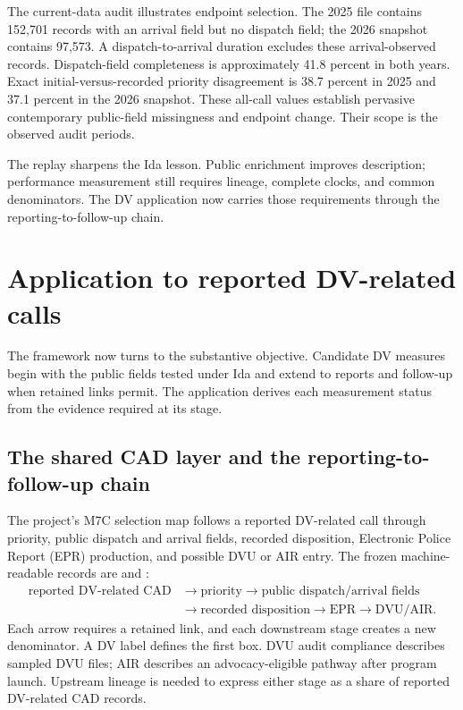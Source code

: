 \documentclass[11pt]{article}
\begin{document}
The current-data audit illustrates endpoint selection. The 2025 file contains 152,701 records with an arrival field but no dispatch field; the 2026 snapshot contains 97,573. A dispatch-to-arrival duration excludes these arrival-observed records. Dispatch-field completeness is approximately 41.8 percent in both years. Exact initial-versus-recorded priority disagreement is 38.7 percent in 2025 and 37.1 percent in the 2026 snapshot. These all-call values establish pervasive contemporary public-field missingness and endpoint change. Their scope is the observed audit periods.

The replay sharpens the Ida lesson. Public enrichment improves description; performance measurement still requires lineage, complete clocks, and common denominators. The DV application now carries those requirements through the reporting-to-follow-up chain.

\section{Application to reported DV-related calls}

The framework now turns to the substantive objective. Candidate DV measures begin with the public fields tested under Ida and extend to reports and follow-up when retained links permit. The application derives each measurement status from the evidence required at its stage.

\subsection{The shared CAD layer and the reporting-to-follow-up chain}

The project's M7C selection map follows a reported DV-related call through priority, public dispatch and arrival fields, recorded disposition, Electronic Police Report (EPR) production, and possible DVU or AIR entry. The frozen machine-readable records are  and :
\begin{equation*}
\begin{aligned}
\text{reported DV-related CAD}
&\rightarrow \text{priority}
\rightarrow \text{public dispatch/arrival fields}\\
&\rightarrow \text{recorded disposition}
\rightarrow \text{EPR}
\rightarrow \text{DVU/AIR}.
\end{aligned}
\end{equation*}
Each arrow requires a retained link, and each downstream stage creates a new denominator. A DV label defines the first box. DVU audit compliance describes sampled DVU files; AIR describes an advocacy-eligible pathway after program launch. Upstream lineage is needed to express either stage as a share of reported DV-related CAD records.
\end{document}
